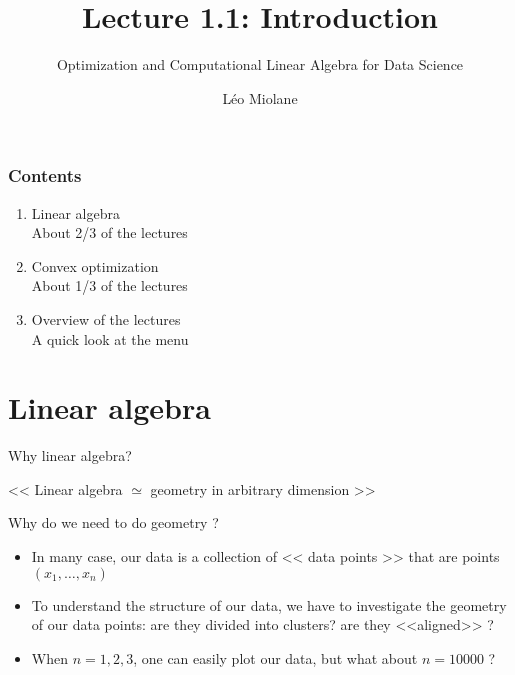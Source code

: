 \documentclass{beamer}
\title{Lecture 1.1: Introduction}
\subtitle{Optimization and Computational Linear Algebra for Data Science}
\author{Léo Miolane}
\date{}
\begin{document}
\setcounter{showProgressBar}{0}
\setcounter{showSlideNumbers}{0}

\frame{\titlepage}

\begin{frame}
	\frametitle{Contents}
	\begin{enumerate}
		\item Linear algebra \\ \textcolor{ExecusharesGrey}{\footnotesize\hspace{1em} About 2/3 of the lectures}
		\item Convex optimization  \\ \textcolor{ExecusharesGrey}{\footnotesize\hspace{1em} About 1/3 of the lectures}
		\item Overview of the lectures \\ \textcolor{ExecusharesGrey}{\footnotesize\hspace{1em} A quick look at the menu}
	\end{enumerate}
\end{frame}


\setcounter{framenumber}{0}
\setcounter{showSlideNumbers}{1}
\section{Linear algebra}
\begin{frame}[t]{Why linear algebra?}
	\vspace{-0.5cm}
	\begin{center}
		<< Linear algebra $\simeq$ geometry in arbitrary dimension >>
	\end{center}


	\begin{block}{Why do we need to do geometry ?}
		\begin{itemize}
			\item In many case, our data is a collection of << data points >> that are points $(x_1, \dots, x_n)$
			\item To understand the structure of our data, we have to investigate the geometry of our data points: are they divided into clusters? are they <<aligned>> ?
			\item When $n =1,2,3$, one can easily plot our data, but what about $n=10000$ ?
		\end{itemize}
	\end{block}
\end{frame}
\end{document}
